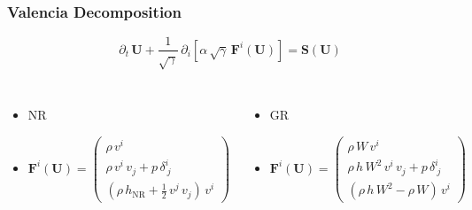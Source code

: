 \documentclass{beamer}
\newcommand{\p}{\partial}
\newcommand{\bs}{\boldsymbol}
\newcommand{\nr}{\mathrm{NR}}
\begin{document}
\begin{frame}
\frametitle{Valencia Decomposition}

  \begin{equation*}
    \p_{t}\,\bs{U}
    +\frac{1}{\sqrt{\gamma}}\,
    \p_{i}\left[\alpha\,\sqrt{\gamma}\,\bs{F}^{i}\left(\bs{U}\right)\right]
    =\bs{S}\left(\bs{U}\right)
  \end{equation*}

  \begin{columns}[c]


      \begin{itemize}
        \item[]
          NR
        \item[]
          $\bs{F}^{i}\left(\bs{U}\right)
          =\begin{pmatrix}
             \rho\,v^{i} \\[1em]
             \rho\,v^{i}\,v_{j} + p\,\delta^{i}_{~j} \\[1em]
             \left(\rho\,h_{\nr}+\frac{1}{2}\,v^{j}\,v_{j}\right)\,v^{i}
           \end{pmatrix}$
      \end{itemize}


      \begin{itemize}
        \item[]
          GR
        \item[]
          $\bs{F}^{i}\left(\bs{U}\right)
          =\begin{pmatrix}
             \rho\,W\,v^{i} \\[1em]
             \rho\,h\,W^{2}\,v^{i}\,v_{j} + p\,\delta^{i}_{~j} \\[1em]
             \left(\rho\,h\,W^{2}-\rho\,W\right)\,v^{i}
           \end{pmatrix}$
      \end{itemize}

  \end{columns}

\end{frame}
\end{document}
